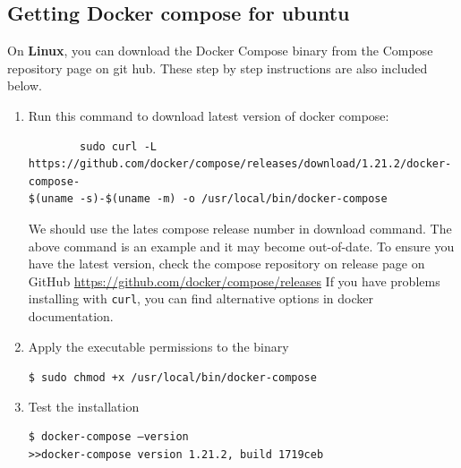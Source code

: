\subsection{Getting Docker compose for ubuntu}
On \textbf{Linux}, you can download the Docker Compose binary from the Compose repository page on git
hub. These step by step instructions are also included below.
\begin{enumerate}
	\item Run this command to download latest version of docker compose:
		\begin{center}
		\begin{verbatim}
		sudo curl -L
https://github.com/docker/compose/releases/download/1.21.2/docker-compose-
$(uname -s)-$(uname -m) -o /usr/local/bin/docker-compose
		\end{verbatim}
		\end{center}
		We should use the lates compose release number in download command. The above command is an example and it may become out-of-date. To ensure you have the latest version, check the compose repository on release page on GitHub \url{https://github.com/docker/compose/releases}
		\newline If you have problems installing with \verb=curl=, you can find alternative options in docker documentation.
	\item Apply the executable permissions to the binary\newline\begin{center}\verb=$ sudo chmod +x /usr/local/bin/docker-compose=\end{center}
	\item Test the installation
		\begin{center}
		\begin{verbatim}
$ docker-compose –version
>>docker-compose version 1.21.2, build 1719ceb
		\end{verbatim}
		\end{center}
\end{enumerate}

